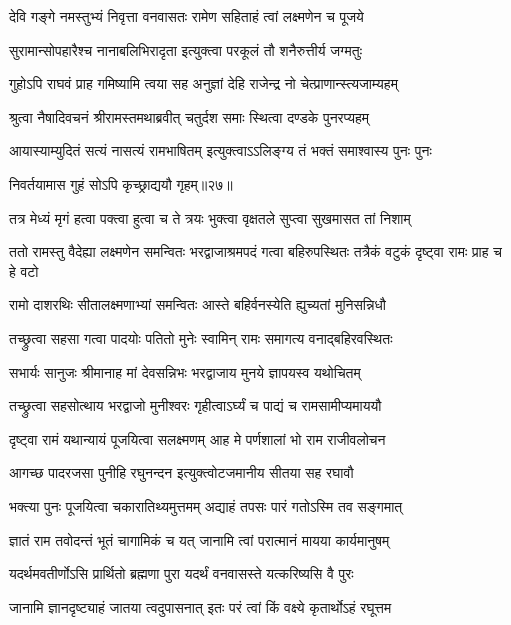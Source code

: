 \twolineshloka
{देवि गङ्गे नमस्तुभ्यं निवृत्ता वनवासतः}
{रामेण सहिताहं त्वां लक्ष्मणेन च पूजये} %

\twolineshloka
{सुरामान्सोपहारैश्च नानाबलिभिरादृता}
{इत्युक्त्वा परकूलं तौ शनैरुत्तीर्य जग्मतुः} %

\twolineshloka
{गुहोऽपि राघवं प्राह गमिष्यामि त्वया सह}
{अनुज्ञां देहि राजेन्द्र नो चेत्प्राणान्स्त्यजाम्यहम्} %

\twolineshloka
{श्रुत्वा नैषादिवचनं श्रीरामस्तमथाब्रवीत्}
{चतुर्दश समाः स्थित्वा दण्डके पुनरप्यहम्} %

\twolineshloka
{आयास्याम्युदितं सत्यं नासत्यं रामभाषितम्}
{इत्युक्त्वाऽऽलिङ्ग्य तं भक्तं समाश्वास्य पुनः पुनः} %

{निवर्तयामास गुहं सोऽपि कृच्छ्राद्ययौ गृहम्॥२७॥} %


\twolineshloka
{तत्र मेध्यं मृगं हत्वा पक्त्वा हुत्वा च ते त्रयः}
{भुक्त्वा वृक्षतले सुप्त्वा सुखमासत तां निशाम्} %

\threelineshloka
{ततो रामस्तु वैदेह्या लक्ष्मणेन समन्वितः}
{भरद्वाजाश्रमपदं गत्वा बहिरुपस्थितः}
{तत्रैकं वटुकं दृष्ट्वा रामः प्राह च हे वटो} %

\twolineshloka
{रामो दाशरथिः सीतालक्ष्मणाभ्यां समन्वितः}
{आस्ते बहिर्वनस्येति ह्युच्यतां मुनिसन्निधौ} %

\twolineshloka
{तच्छ्रुत्वा सहसा गत्वा पादयोः पतितो मुनेः}
{स्वामिन् रामः समागत्य वनाद्बहिरवस्थितः} %

\twolineshloka
{सभार्यः सानुजः श्रीमानाह मां देवसन्निभः}
{भरद्वाजाय मुनये ज्ञापयस्व यथोचितम्} %

\twolineshloka
{तच्छ्रुत्वा सहसोत्थाय भरद्वाजो मुनीश्वरः}
{गृहीत्वाऽर्घ्यं च पाद्यं च रामसामीप्यमाययौ} %

\twolineshloka
{दृष्ट्वा रामं यथान्यायं पूजयित्वा सलक्ष्मणम्}
{आह मे पर्णशालां भो राम राजीवलोचन} %

\twolineshloka
{आगच्छ पादरजसा पुनीहि रघुनन्दन}
{इत्युक्त्वोटजमानीय सीतया सह रघावौ} %

\twolineshloka
{भक्त्या पुनः पूजयित्वा चकारातिथ्यमुत्तमम्}
{अद्याहं तपसः पारं गतोऽस्मि तव सङ्गमात्} %

\twolineshloka
{ज्ञातं राम तवोदन्तं भूतं चागामिकं च यत्}
{जानामि त्वां परात्मानं मायया कार्यमानुषम्} %

\twolineshloka
{यदर्थमवतीर्णोऽसि प्रार्थितो ब्रह्मणा पुरा}
{यदर्थं वनवासस्ते यत्करिष्यसि वै पुरः} %

\twolineshloka
{जानामि ज्ञानदृष्ट्याहं जातया त्वदुपासनात्}
{इतः परं त्वां किं वक्ष्ये कृतार्थोऽहं रघूत्तम} %

